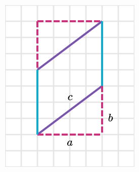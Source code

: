 \begin{solutionbox}{16cm}
\begin{minipage}{0.4\textwidth}
\begin{multicols}{2}
\begin{figure}[H]
                \caption{}
                \label{fig:peri_paralelogramo_01a}
            \end{figure}
            \begin{figure}[H]
                \centering
                \includegraphics[width=0.9\linewidth]{../images/peri_paralelogramo_01b.png}
                \caption{}
                \label{fig:peri_paralelogramo_01b}
            \end{figure}
        \end{multicols}
        \begin{multicols}{2}
            \begin{figure}[H]
                \centering

\end{figure}
\end{multicols}
\end{minipage}
\end{solutionbox}
